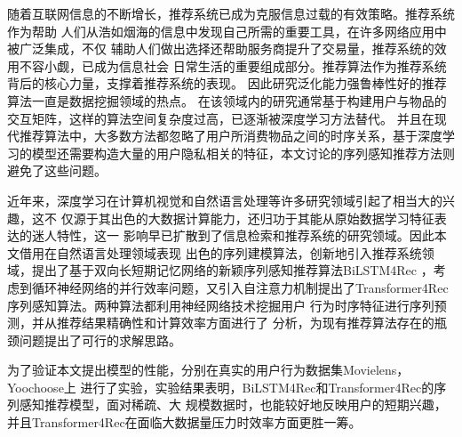 ﻿%
\begin{cabstract}

    随着互联网信息的不断增长，推荐系统已成为克服信息过载的有效策略。推荐系统作为帮助%
    人们从浩如烟海的信息中发现自己所需的重要工具，在许多网络应用中被广泛集成，不仅%
    辅助人们做出选择还帮助服务商提升了交易量，推荐系统的效用不容小觑，已成为信息社会%
    日常生活的重要组成部分。推荐算法作为推荐系统背后的核心力量，支撑着推荐系统的表现。%
    因此研究泛化能力强鲁棒性好的推荐算法一直是数据挖掘领域的热点。
    在该领域内的研究通常基于构建用户与物品的交互矩阵，这样的算法空间复杂度过高，已逐渐被深度学习方法替代。
    并且在现代推荐算法中，大多数方法都忽略了用户所消费物品之间的时序关系，基于深度学习的模型还需要构造大量的用户隐私相关的特征，本文讨论的序列感知推荐方法则避免了这些问题。

    近年来，深度学习在计算机视觉和自然语言处理等许多研究领域引起了相当大的兴趣，这不%
    仅源于其出色的大数据计算能力，还归功于其能从原始数据学习特征表达的迷人特性，这一%
    影响早已扩散到了信息检索和推荐系统的研究领域。因此本文借用在自然语言处理领域表现
    出色的序列建模算法，创新地引入推荐系统领域，提出了基于双向长短期记忆网络的新颖序列感知推荐算法BiLSTM4Rec
    ，考虑到循环神经网络的并行效率问题，又引入自注意力机制提出了Transformer4Rec序列感知算法。两种算法都利用神经网络技术挖掘用户%
    行为时序特征进行序列预测，并从推荐结果精确性和计算效率方面进行了%
    分析，为现有推荐算法存在的瓶颈问题提出了可行的求解思路。

    为了验证本文提出模型的性能，分别在真实的用户行为数据集Movielens，Yoochoose上%
    进行了实验，实验结果表明，BiLSTM4Rec和Transformer4Rec的序列感知推荐模型，面对稀疏、大%
    规模数据时，也能较好地反映用户的短期兴趣，并且Transformer4Rec在面临大数据量压力时效率方面更胜一筹。

\end{cabstract}

